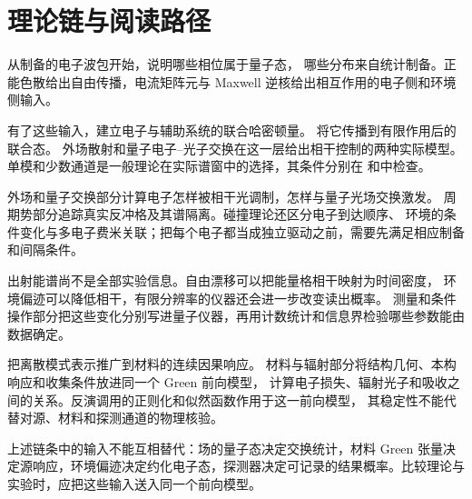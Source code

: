 \chapter*{理论链与阅读路径}

从制备的电子波包开始，说明哪些相位属于量子态，
哪些分布来自统计制备。正能色散给出自由传播，电流矩阵元与 Maxwell 逆核给出相互作用的电子侧和环境侧输入。

有了这些输入，建立电子与辅助系统的联合哈密顿量。
将它传播到有限作用后的联合态。
外场散射和量子电子--光子交换在这一层给出相干控制的两种实际模型。
单模和少数通道是一般理论在实际谱窗中的选择，其条件分别在
和中检查。

外场和量子交换部分计算电子怎样被相干光调制，怎样与量子光场交换激发。
周期势部分追踪真实反冲格及其谱隔离。碰撞理论还区分电子到达顺序、
环境的条件变化与多电子费米关联；把每个电子都当成独立驱动之前，需要先满足相应制备和间隔条件。

出射能谱尚不是全部实验信息。自由漂移可以把能量格相干映射为时间密度，
环境偏迹可以降低相干，有限分辨率的仪器还会进一步改变读出概率。
测量和条件操作部分把这些变化分别写进量子仪器，再用计数统计和信息界检验哪些参数能由数据确定。

把离散模式表示推广到材料的连续因果响应。
材料与辐射部分将结构几何、本构响应和收集条件放进同一个 Green 前向模型，
计算电子损失、辐射光子和吸收之间的关系。反演调用的正则化和似然函数作用于这一前向模型，
其稳定性不能代替对源、材料和探测通道的物理核验。

上述链条中的输入不能互相替代：场的量子态决定交换统计，材料 Green 张量决定源响应，环境偏迹决定约化电子态，探测器决定可记录的结果概率。比较理论与实验时，应把这些输入送入同一个前向模型。
